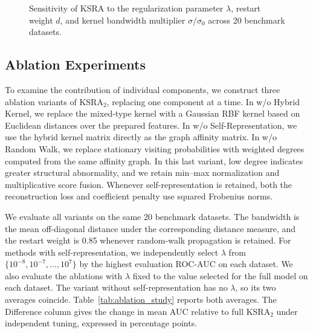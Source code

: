 \documentclass[ASNA,twocolumn]{USG} %
\begin{document}
\begin{figure}[t]
    \caption{Sensitivity of KSRA to the regularization parameter $\lambda$, restart weight $d$, and kernel bandwidth multiplier $\sigma/\sigma_0$ across 20 benchmark datasets.}
    \label{fig:parameters_sensitivity}
\end{figure}


\subsection{Ablation Experiments}

To examine the contribution of individual components, we construct three ablation variants of KSRA$_2$, replacing one component at a time. In w/o Hybrid Kernel, we replace the mixed-type kernel with a Gaussian RBF kernel based on Euclidean distances over the prepared features. In w/o Self-Representation, we use the hybrid kernel matrix directly as the graph affinity matrix. In w/o Random Walk, we replace stationary visiting probabilities with weighted degrees computed from the same affinity graph. In this last variant, low degree indicates greater structural abnormality, and we retain min–max normalization and multiplicative score fusion. Whenever self-representation is retained, both the reconstruction loss and coefficient penalty use squared Frobenius norms.

We evaluate all variants on the same 20 benchmark datasets. The bandwidth is the mean off-diagonal distance under the corresponding distance measure, and the restart weight is 0.85 whenever random-walk propagation is retained. For methods with self-representation, we independently select $\lambda$ from $\{10^{-8},10^{-7},\ldots,10^{7}\}$ by the highest evaluation ROC-AUC on each dataset. We also evaluate the ablations with $\lambda$ fixed to the value selected for the full model on each dataset. The variant without self-representation has no $\lambda$, so its two averages coincide. Table~\ref{tab:ablation_study} reports both averages. The Difference column gives the change in mean AUC relative to full KSRA$_2$ under independent tuning, expressed in percentage points.
\end{document}
